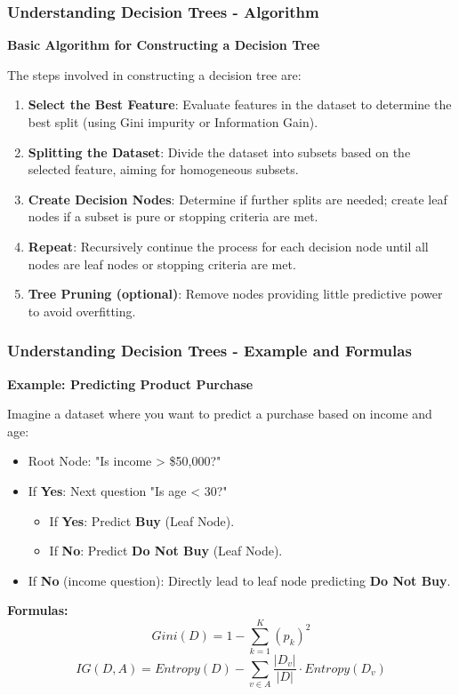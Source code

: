 \documentclass[aspectratio=169]{beamer}
\begin{document}
\begin{frame}[fragile]
    \frametitle{Understanding Decision Trees - Algorithm}
    \textbf{Basic Algorithm for Constructing a Decision Tree}
    
    The steps involved in constructing a decision tree are:
    \begin{enumerate}
        \item \textbf{Select the Best Feature}: Evaluate features in the dataset to determine the best split (using Gini impurity or Information Gain).
        \item \textbf{Splitting the Dataset}: Divide the dataset into subsets based on the selected feature, aiming for homogeneous subsets.
        \item \textbf{Create Decision Nodes}: Determine if further splits are needed; create leaf nodes if a subset is pure or stopping criteria are met.
        \item \textbf{Repeat}: Recursively continue the process for each decision node until all nodes are leaf nodes or stopping criteria are met.
        \item \textbf{Tree Pruning (optional)}: Remove nodes providing little predictive power to avoid overfitting.
    \end{enumerate}
\end{frame}

\begin{frame}[fragile]
    \frametitle{Understanding Decision Trees - Example and Formulas}
    \textbf{Example: Predicting Product Purchase}
    
    Imagine a dataset where you want to predict a purchase based on income and age:

    \begin{itemize}
        \item Root Node: "Is income > \$50,000?"
        \item If \textbf{Yes}: Next question "Is age < 30?"
            \begin{itemize}
                \item If \textbf{Yes}: Predict \textbf{Buy} (Leaf Node).
                \item If \textbf{No}: Predict \textbf{Do Not Buy} (Leaf Node).
            \end{itemize}
        \item If \textbf{No} (income question): Directly lead to leaf node predicting \textbf{Do Not Buy}.
    \end{itemize}
    
    \textbf{Formulas:}
    \begin{equation}
        Gini(D) = 1 - \sum_{k=1}^{K} (p_k)^2
    \end{equation}
    \begin{equation}
        IG(D, A) = Entropy(D) - \sum_{v \in A} \frac{|D_v|}{|D|} \cdot Entropy(D_v)
    \end{equation}
\end{frame}
\end{document}
